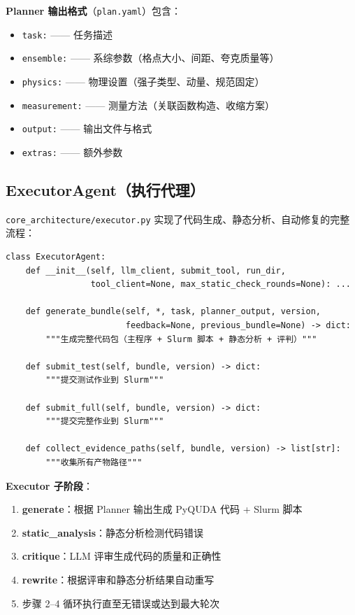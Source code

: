 \documentclass[12pt,a4paper]{ctexart}
\begin{document}
\textbf{Planner 输出格式}（\texttt{plan.yaml}）包含：
\begin{itemize}[itemsep=2pt]
    \item \texttt{task:} —— 任务描述
    \item \texttt{ensemble:} —— 系综参数（格点大小、间距、夸克质量等）
    \item \texttt{physics:} —— 物理设置（强子类型、动量、规范固定）
    \item \texttt{measurement:} —— 测量方法（关联函数构造、收缩方案）
    \item \texttt{output:} —— 输出文件与格式
    \item \texttt{extras:} —— 额外参数
\end{itemize}

\subsection{ExecutorAgent（执行代理）}

\label{sec:executor}

\texttt{core\_architecture/executor.py} 实现了代码生成、静态分析、自动修复的完整流程：

\begin{lstlisting}[style=pycode]
class ExecutorAgent:
    def __init__(self, llm_client, submit_tool, run_dir,
                 tool_client=None, max_static_check_rounds=None): ...

    def generate_bundle(self, *, task, planner_output, version,
                        feedback=None, previous_bundle=None) -> dict:
        """生成完整代码包（主程序 + Slurm 脚本 + 静态分析 + 评判）"""

    def submit_test(self, bundle, version) -> dict:
        """提交测试作业到 Slurm"""

    def submit_full(self, bundle, version) -> dict:
        """提交完整作业到 Slurm"""

    def collect_evidence_paths(self, bundle, version) -> list[str]:
        """收集所有产物路径"""
\end{lstlisting}

\textbf{Executor 子阶段}：
\begin{enumerate}[itemsep=3pt]
    \item \textbf{generate}：根据 Planner 输出生成 PyQUDA 代码 + Slurm 脚本
    \item \textbf{static\_analysis}：静态分析检测代码错误
    \item \textbf{critique}：LLM 评审生成代码的质量和正确性
    \item \textbf{rewrite}：根据评审和静态分析结果自动重写
    \item 步骤 2--4 循环执行直至无错误或达到最大轮次
\end{enumerate}
\end{document}
